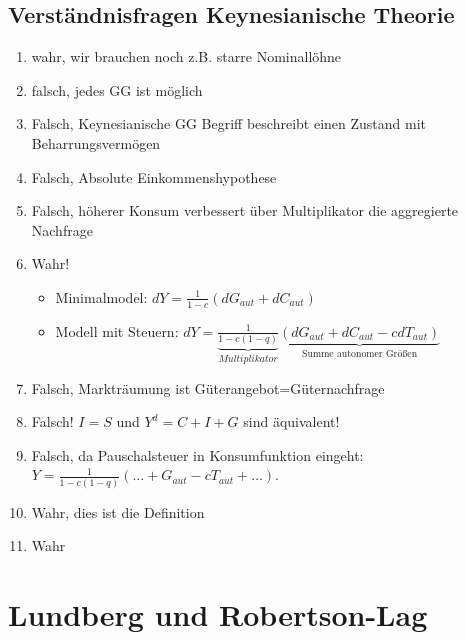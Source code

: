 \documentclass{scrartcl}
\begin{document}
\subsection{Verst\"{a}ndnisfragen Keynesianische Theorie}
\begin{enumerate}
  \item wahr, wir brauchen noch z.B. starre Nominall\"{o}hne
  \item falsch, jedes GG ist m\"{o}glich
  \item Falsch, Keynesianische GG Begriff beschreibt einen Zustand mit Beharrungsverm\"{o}gen
  \item Falsch, Absolute Einkommenshypothese
  \item Falsch, h\"{o}herer Konsum verbessert \"{u}ber Multiplikator die aggregierte Nachfrage
  \item Wahr!
  \begin{itemize}
  \item Minimalmodel: $d Y = \frac{1}{1-c}(d G_{aut} + d C_{aut})$
  \item Modell mit Steuern: $d Y = \underbrace{\frac{1}{1-c(1-q)}}_{Multiplikator}\underbrace{(d G_{aut} + d C_{aut} - c d T_{aut})}_\text{Summe autonomer Gr\"{o}{\ss}en}$
  \end{itemize}
  \item Falsch, Marktr\"{a}umung ist G\"{u}terangebot=G\"{u}ternachfrage
  \item Falsch! $I=S$ und $Y^d=C+I+G$ sind \"{a}quivalent!
  \item Falsch, da Pauschalsteuer in Konsumfunktion eingeht: \\$Y = \frac{1}{1-c(1-q)}(\dots+G_{aut}-c T_{aut}+\dots)$.
  \item Wahr, dies ist die Definition
  \item Wahr
\end{enumerate}

\section{Lundberg und Robertson-Lag}
\end{document}
